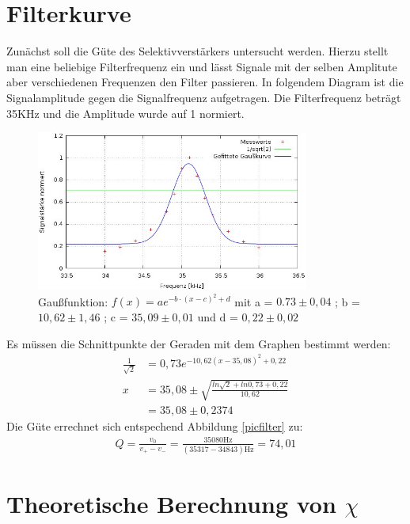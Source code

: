 \section{Filterkurve}
Zunächst soll die Güte des Selektivverstärkers untersucht werden. Hierzu stellt man eine beliebige Filterfrequenz ein und lässt Signale mit der selben Amplitute aber verschiedenen Frequenzen den Filter passieren. In folgendem Diagram ist die Signalamplitude gegen die Signalfrequenz aufgetragen. Die Filterfrequenz beträgt 35KHz und die Amplitude wurde auf 1 normiert.
\begin{figure}[htbp]
\includegraphics[width=0.8\textwidth]{pics/guete.jpg}
\caption{Gaußfunktion: $f(x)=ae^{-b\cdot (x-c)^2+d}$ mit a = $0.73\pm 0,04$ ; b = $10,62\pm 1,46$ ; c = $35,09 \pm 0,01$ und d = $0,22\pm0,02$}
\end{figure}

Es müssen die Schnittpunkte der Geraden mit dem Graphen bestimmt werden:
\begin{align*}
\frac{1}{\sqrt{2}} &= 0,73e^{-10,62(x-35,08)^2+0,22} \\
x&= 35,08 \pm \sqrt{\frac{ln\sqrt{2} +ln 0,73 +0,22}{10,62}}\\
&= 35,08\pm 0,2374
\end{align*}
Die Güte errechnet sich entspechend Abbildung \ref{picfilter} zu:
\begin{align*}
Q=\frac{v_0}{v_+ - v_-}=\frac{35080\text{Hz}}{(35317-34843)\text{Hz}}=74,01
\end{align*}

\section{Theoretische Berechnung von $\chi$}
